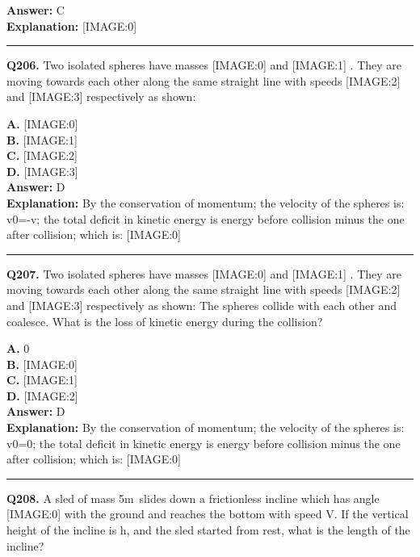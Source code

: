 \documentclass[12pt]{article}
\begin{document}
\textbf{Answer:} C \\
\textbf{Explanation:} [IMAGE:0]

\hrule
\vspace{1em}


\noindent
\textbf{Q206.} Two isolated spheres have masses
[IMAGE:0]
and
[IMAGE:1]
. They are moving towards each other along the same straight line with speeds
[IMAGE:2]
and
[IMAGE:3]
respectively as shown:



\textbf{A.} [IMAGE:0] \\
\textbf{B.} [IMAGE:1] \\
\textbf{C.} [IMAGE:2] \\
\textbf{D.} [IMAGE:3] \\

\textbf{Answer:} D \\
\textbf{Explanation:} By the conservation of momentum; the velocity of the spheres is: v0=-v; the total deficit in kinetic energy is energy before collision minus the one after collision; which is:
[IMAGE:0]

\hrule
\vspace{1em}


\noindent
\textbf{Q207.} Two isolated spheres have masses
[IMAGE:0]
and
[IMAGE:1]
. They are moving towards each other along the same straight line with speeds
[IMAGE:2]
and
[IMAGE:3]
respectively as shown:
The spheres collide with each other and coalesce. What is the loss of kinetic energy during the collision?



\textbf{A.} 0 \\
\textbf{B.} [IMAGE:0] \\
\textbf{C.} [IMAGE:1] \\
\textbf{D.} [IMAGE:2] \\

\textbf{Answer:} D \\
\textbf{Explanation:} By the conservation of momentum; the velocity of the spheres is: v0=0; the total deficit in kinetic energy is energy before collision minus the one after collision; which is:
[IMAGE:0]

\hrule
\vspace{1em}


\noindent
\textbf{Q208.} A sled of mass 5m slides down a frictionless incline which has angle
[IMAGE:0]
with the ground and reaches the bottom with speed V. If the vertical height of the incline is h, and the sled started from rest, what is the length of the incline?
\end{document}
